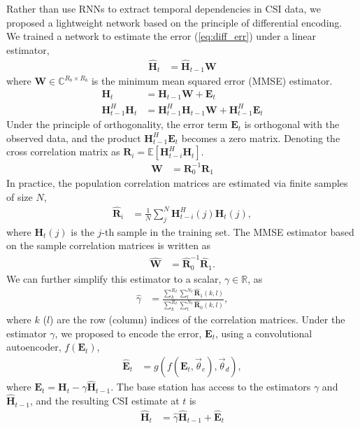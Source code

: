 Rather than use RNNs to extract temporal dependencies in CSI data, we proposed a lightweight network based on the principle of differential encoding. We trained a network to estimate the error (\ref{eq:diff_err}) under a linear estimator, 
\begin{align*}
	\hat{\mathbf H}_t &=  \hat{\mathbf H}_{t-1} \mathbf W
\end{align*}
where $\mathbf W \in \mathbb C^{R_b \times R_b}$ is the minimum mean squared error (MMSE) estimator.
\begin{align*}
	\mathbf H_t &= \mathbf H_{t-1}\mathbf W + \mathbf E_t \\
	\mathbf H_{t-1}^H\mathbf H_t &= \mathbf H_{t-1}^H\mathbf H_{t-1} \mathbf W + \mathbf H_{t-1}^H\mathbf E_t
\end{align*}
Under the principle of orthogonality, the error term $\mathbf E_t$ is orthogonal with the observed data, and the product $\mathbf H^H_{t-1}\mathbf E_t$ becomes a zero matrix. Denoting the cross correlation matrix as $\mathbf R_{i} = \mathbb{E}\left[\mathbf H_{t-i}^H\mathbf H_{t}\right]$.
\begin{align*}
	\mathbf W &= \mathbf R_0^{-1} \mathbf R_1 
\end{align*}
In practice, the population correlation matrices are estimated
via finite samples of size $N$,
\begin{align*}
	\mathbf{\hat R}_i &= \frac 1N \sum_{j}^N \mathbf H_{t-i}^H(j)\mathbf H_{t}(j),
\end{align*}
where $\mathbf H_t(j)$ is the $j$-th sample in the training set.
The MMSE estimator based on the sample correlation matrices is written as
\begin{align*}
	\hat{\mathbf W} &= \hat{\mathbf R}_0^{-1} \hat{\mathbf R}_1.
\end{align*}
We can further simplify this estimator to a scalar, $\gamma \in \mathbb R$, as
\begin{align*}
	\hat \gamma &= \frac{\sum_k^{R_d}\sum_l^{N_b}\hat{\mathbf R}_1(k,l)}{\sum_k^{R_d}\sum_l^{N_b}\hat{\mathbf R}_0(k,l)},
\end{align*}
where $k$ ($l$) are the row (column) indices of the correlation matrices. Under the estimator $\gamma$, we proposed to encode the error, $\mathbf E_t$, using a convolutional autoencoder, $f(\mathbf E_t)$,
\begin{align*}
	\hat{\mathbf E}_t &= g(f(\mathbf E_t, \vec\theta_e), \vec\theta_d),
\end{align*}
where $\mathbf E_t = \mathbf H_t - \gamma\hat{\mathbf H}_{t-1}$. The base station has access to the estimators $\gamma$ and $\hat{\mathbf H}_{t-1}$, and the resulting CSI estimate at $t$ is
\begin{align*}
	\hat{\mathbf H}_t &= \hat\gamma \hat{\mathbf H}_{t-1} + \hat{\mathbf{E}}_t
\end{align*}

